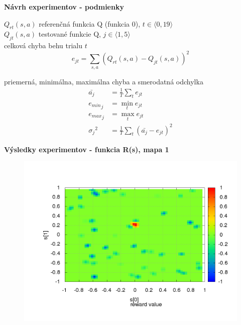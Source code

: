 \documentclass[xcolor=dvipsnames]{beamer}
\begin{document}
\begin{frame}{\bf Návrh experimentov - podmienky}


$Q_{rt}(s,a)$ referenčná funkcia Q (funkcia 0), $t \in \langle 0, 19 \rangle $  \\
$Q_{jt}(s,a)$ testované funkcie Q, $j \in \langle 1, 5 \rangle $ \\

celková chyba behu trialu $t$  \\
\begin{equation}
e_{jt} = \sum\limits_{s, a}{(Q_{rt}(s,a) - Q_{jt}(s,a))^2}  \nonumber
\end{equation}

priemerná, minimálna, maximálna chyba a smerodatná odchylka \\
\begin{align}
\bar{a_j} &= \frac{1}{T}\sum\limits_{t}{e_{jt}}  \nonumber \\
{e_{min}}_j &= \min_{t}{e_{jt}}  \nonumber \\
{e_{max}}_j &= \max_{t}{e_{jt}}  \nonumber \\
{\sigma_j}^2 &= \frac{1}{T}\sum\limits_{t}{(\bar{a_j} - e_{jt})^2}  \nonumber
\end{align}

\end{frame}


\begin{frame}{\bf Výsledky experimentov - funkcia R(s), mapa 1}

\begin{figure}[!htb]
\centering
\includegraphics[scale=.4]{../../results_q_learning/map_1/reward_value_surface.png}
\end{figure}

\end{frame}
\end{document}
